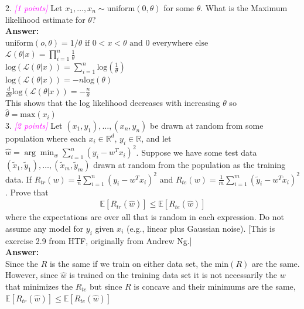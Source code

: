\documentclass{article}
\newcommand{\1}{\mathbf{1}}
\def\E{\mathbb{E}}
\def\R{\mathbb{R}}
\newcommand{\grade}[1]{\small\textcolor{magenta}{\emph{[#1 points]}} \normalsize}
\begin{document}
2. \grade{1}  Let $x_1,\dots,x_n \sim \text{uniform}(0,\theta)$ for some $\theta$. What is the Maximum likelihood estimate for $\theta$?\\

\textbf{Answer:}\\

$\text{uniform}(o,\theta)= 1/\theta \text{ if } 0<x<\theta \text{ and } 0 \text{ everywhere else}$\\

$\mathcal{L}(\theta | x)= \prod_{i=1}^n \frac{1}{\theta}$\\
$\text{log}(\mathcal{L}(\theta | x))= \sum_{i=1}^n \text{log}(\frac{1}{\theta})$\\
$\text{log}(\mathcal{L}(\theta | x))= -n \text{log}({\theta})$\\
$\frac{d}{d\theta} \text{log}(\mathcal{L}(\theta | x))= -\frac{n}{\theta}$\\
This shows that the log likelihood decreases with increasing $\theta$ so\\
$\widehat{\theta}=\text{max}(x_i)$\\

3. \grade{2} Let $(x_1,y_1),\dots,(x_n,y_n)$ be drawn at random from some population where each $x_i \in \R^d$, $y_i \in \R$, and let $\widehat{w} = \arg\min_w \sum_{i=1}^n (y_i - w^T x_i)^2$.
Suppose we have some test data $(\widetilde{x}_1,\widetilde{y}_1),\dots,(\widetilde{x}_m,\widetilde{y}_m)$ drawn at random from the population as the training data. 
If $R_{tr}(w) = \frac{1}{n} \sum_{i=1}^n (y_i - w^T x_i)^2$ and $R_{te}(w) = \frac{1}{m} \sum_{i=1}^m (\widetilde{y}_i - w^T \widetilde{x}_i)^2$. Prove that 
\begin{align*}
\E[ R_{tr}(\widehat{w}) ] \leq \E[ R_{te}(\widehat{w}) ]
\end{align*}
where the expectations are over all that is random in each expression. Do not assume any model for $y_i$ given $x_i$ (e.g., linear plus Gaussian noise). [This is exercise 2.9 from HTF, originally from Andrew Ng.]\\

\textbf{Answer:}\\

Since the $R$ is the same if we train on either data set, the min$(R)$ are the same. However, since $\widehat{w}$ is trained on the training data set it is not necessarily the $w$ that minimizes the $R_{te}$ but since $R$ is concave and their minimums are the same, $\E[ R_{tr}(\widehat{w}) ] \leq \E[ R_{te}(\widehat{w}) ]$ \\
\end{document}
